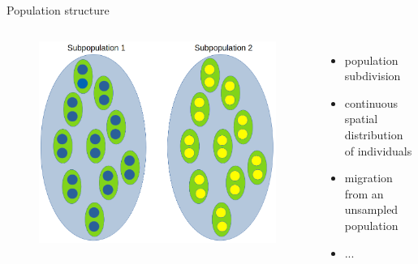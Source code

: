 \begin{frame}{Population structure}

	\begin{columns}


                \begin{figure}
                        \includegraphics[width=1\textwidth]{Pics/structure}
                \end{figure}


                \small
                \begin{itemize}
                	\item population subdivision
                        \item continuous spatial distribution of individuals
                        \item migration from an unsampled population
			\item ...
                \end{itemize}

        \end{columns}

\end{frame}


